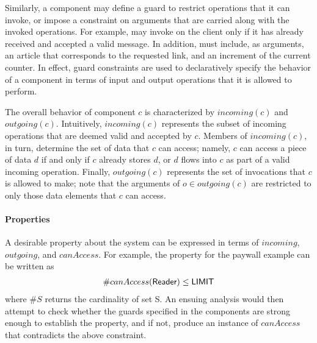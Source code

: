 Similarly, a component may define a guard to restrict operations that
it can invoke, or impose a constraint on arguments that are carried
along with the invoked operations. For example,  may
invoke  on the client only if it has already received
and accepted a valid  message. In addition,
 must include, as arguments, an article that
corresponds to the requested link, and an increment of the current
counter.  In effect, guard constraints are used to
declaratively specify the behavior of a component in terms of input
and output operations that it is allowed to perform.

The overall behavior of component $c$ is characterized by
$incoming(c)$ and $outgoing(c)$. Intuitively, $incoming(c)$ represents
the subset of incoming operations that are deemed valid and accepted
by $c$. Members of $incoming(c)$, in turn, determine the set of data
that $c$ can access; namely, $c$ can access a piece of data $d$ if and
only if $c$ already stores $d$, or $d$ flows into $c$ as part of a
valid incoming operation. Finally, $outgoing(c)$ represents the set of
invocations that $c$ is allowed to make; note that the arguments of $o
\in outgoing(c)$ are restricted to only those data elements that $c$
can access.

\paragraph{\textbf{Properties}} A desirable property about the system
can be expressed in terms of $incoming$, $outgoing$, and
$canAccess$. For example, the property for the paywall example can be
written as
\begin{align*}
\# canAccess(\textsf{Reader}) \leq \textsf{LIMIT}
\end{align*}
where $\# S$ returns the cardinality of set S. An ensuing analysis
would then attempt to check whether the guards specified in the
components are strong enough to establish the property, and if not,
produce an instance of $canAccess$ that contradicts the above
constraint. 

%
